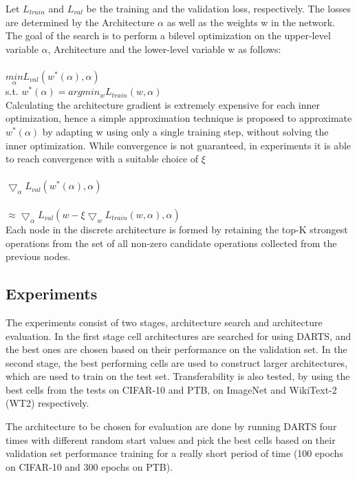 \documentclass{ieee}
\begin{document}
Let $L_{train}$ and $L_{val}$ be the training and the validation loss, respectively. The losses are determined by the Architecture $\alpha$ as well as the weights w in the network. The goal of the search is to perform a bilevel optimization on the upper-level variable $\alpha$, Architecture  and the lower-level variable w as follows:\\ \\
$\underset{\alpha}{min}  L_{val}(w^*(\alpha), \alpha)$ \\ 

s.t. $ w^* (\alpha) = argmin_w L_{train}(w, \alpha)$ \\

Calculating the architecture gradient is extremely expensive for each inner optimization, hence a simple approximation technique is proposed to approximate $ w^*( \alpha ) $ by adapting w using only a single training step, without solving the inner optimization. While convergence is not guaranteed, in experiments it is able to reach convergence with a suitable choice of $\xi$ \\ \\
$\bigtriangledown_\alpha L_{val}(w^*(\alpha), \alpha)$ \\ \\ 
$\approx \bigtriangledown_\alpha L_{val}(w - \xi \bigtriangledown_w L_{train}(w, \alpha), \alpha)$ \\

Each node in the discrete architecture is formed by retaining the top-K strongest operations from the set of all non-zero candidate operations collected from the previous nodes.

\subsection{Experiments}
The experiments consist of two stages, architecture search and architecture evaluation. In the first stage cell architectures are searched for using DARTS, and the best ones are chosen based on their performance on the validation set. In the second stage, the best performing cells are used to construct larger architectures, which are used to train on the test set. Transferability is also tested, by using the best cells from the tests on CIFAR-10 and PTB, on ImageNet and WikiText-2 (WT2) respectively.

The architecture to be chosen for evaluation are done by running DARTS four times with different random start values and pick the best cells based on their validation set performance training for a really short period of time (100 epochs on CIFAR-10 and 300 epochs on PTB). 
\end{document}
